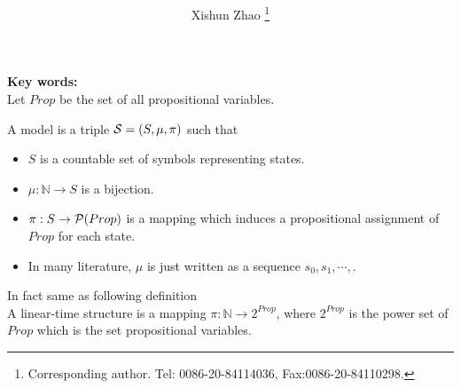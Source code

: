 \documentclass[12pt]{article}
\begin{document}
\begin{CJK*}{GBK}{song}
\CJKtilde




\title{
}

\author{
Xishun Zhao \footnote{Corresponding author. Tel: 0086-20-84114036,
Fax:0086-20-84110298.}
}





\maketitle

\begin{abstract}

\end{abstract}




{\bf Key words:} \\

Let $Prop$ be the set of all propositional variables.
\vskip 2mm

A model
is a triple
${\cal S}=(S,\mu,\pi)$ such that
\begin{itemize}
\item $S$ is a countable set of symbols representing states.
\item $\mu: \mathbb{N}\rightarrow S$ is a bijection.
\item $\pi: S\rightarrow {\cal P}(Prop)$ is a mapping which induces a propositional assignment of $Prop$ for each state.
\item In many literature, $\mu$ is just written as a sequence $s_0,s_1,\cdots,$.
\end{itemize}


In fact same as following definition\\

A linear-time structure is a mapping $\pi:\mathbb{N}\rightarrow 2^{Prop}$, where $2^{Prop}$ is the power set of $Prop$ which is the set propositional variables. \\


\end{CJK*}
\end{document}

